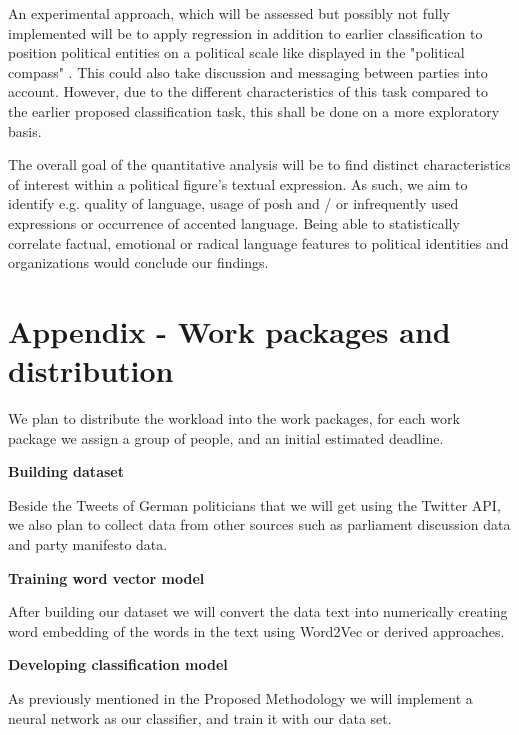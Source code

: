 \documentclass[10pt, oneside]{article}
\begin{document}
\begin{multicols}{2}
An experimental approach, which will be assessed but possibly not fully implemented will be to apply regression in addition to earlier classification to position political entities on a political scale like displayed in the "political compass" \cite{PoliticalCompass2017}. This could also take discussion and messaging between parties into account.
However, due to the different characteristics of this task compared to the earlier proposed classification task, this shall be done on a more exploratory basis. 

The overall goal of the quantitative analysis will be to find distinct characteristics of interest within a political figure's textual expression. As such, we aim to identify e.g. quality of language, usage of posh and / or infrequently used expressions or occurrence of accented language.
Being able to statistically correlate factual, emotional or radical language features to political identities and organizations would conclude our findings.


\end{multicols}
\newpage

\section{Appendix - Work packages and distribution}

We plan to distribute the workload into the work packages, for each work package we assign a group of people, and an initial estimated deadline.

\begin{flushleft}
\textbf{Building dataset}

Beside the Tweets of German politicians that we will get using the Twitter API, we also plan to collect data from other sources such as parliament discussion data and party manifesto data.
\end{flushleft}

\begin{flushleft}
\textbf{Training word vector model}

After building our dataset we will convert the data text into numerically creating word embedding of the words in the text using Word2Vec or derived approaches.
\end{flushleft}

\begin{flushleft}
\textbf{Developing classification model}

As previously mentioned in the Proposed Methodology we will implement a neural network as our classifier, and train it with our data set.
\end{flushleft}
\end{document}
